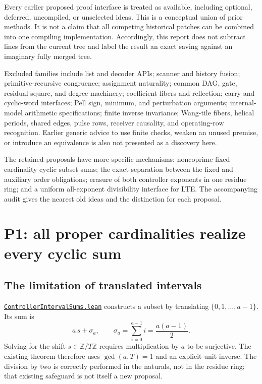 \documentclass[11pt,letterpaper]{article}
\newcommand{\Z}{\mathbb Z}
\newcommand{\Zm}[1]{\Z/#1\Z}
\newcommand{\repobase}{https://github.com/VladimirReshetnikov/ProveIt/blob/9f35798db4a63c25e435fca14d75931144657d7e}
\newcommand{\leanfile}[1]{\href{\repobase/Computability/DiophantineConsistency/Lean/DiophantineConsistency/#1.lean}{\nolinkurl{#1.lean}}}
\begin{document}
Every earlier proposed proof interface is treated as available, including
optional, deferred, uncompiled, or unselected ideas. This is a conceptual
union of prior methods. It is not a claim that all competing historical
patches can be combined into one compiling implementation. Accordingly,
this report does not subtract lines from the current tree and label the result
an exact saving against an imaginary fully merged tree.

Excluded families include list and decoder APIs; scanner and history fusion;
primitive-recursive congruence; assignment naturality; common DAG, gate,
residual-square, and degree machinery; coefficient fibers and reflection;
carry and cyclic-word interfaces; Pell sign, minimum, and perturbation
arguments; internal-model arithmetic specifications; finite inverse
invariance; Wang-tile fibers, helical periods, shared edges, pulse rows,
receiver causality, and operating-row recognition. Earlier generic advice to
use finite checks, weaken an unused premise, or introduce an equivalence is
also not presented as a discovery here.

The retained proposals have more specific mechanisms: noncoprime
fixed-cardinality cyclic subset sums; the exact separation between the fixed
and auxiliary order obligations; erasure of both controller exponents in one
residue ring; and a uniform all-exponent divisibility interface for LTE.
The accompanying audit gives the nearest old ideas and the distinction for
each proposal.

\section{P1: all proper cardinalities realize every cyclic sum}
\label{sec:subset}

\subsection{The limitation of translated intervals}

\leanfile{ControllerIntervalSums} constructs a subset by translating
$\{0,1,\ldots,a-1\}$. Its sum is
\[
 a\,s+\sigma_a,\qquad \sigma_a=\sum_{i=0}^{a-1}i=\frac{a(a-1)}2.
\]
Solving for the shift $s\in\Zm T$ requires multiplication by $a$ to be
surjective. The existing theorem therefore uses $\gcd(a,T)=1$ and an
explicit unit inverse. The division by two is correctly performed in the
naturals, not in the residue ring; that existing safeguard is not itself
a new proposal.
\end{document}

